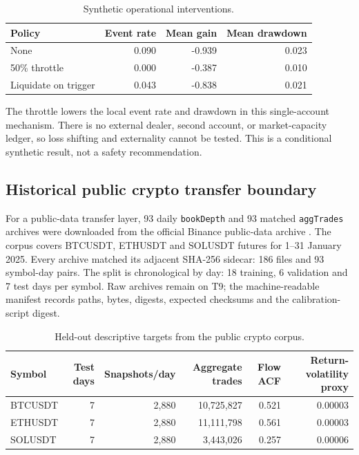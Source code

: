 \documentclass[11pt,a4paper]{article}
\theoremstyle{definition}
\theoremstyle{remark}
\begin{document}
\begin{table}[htbp]
\centering\small
\caption{Synthetic operational interventions.}
\label{tab:next_intervention}
\begin{tabular}{lrrr}
\toprule
Policy & Event rate & Mean gain & Mean drawdown\\
\midrule
None & 0.090 & -0.939 & 0.023\\
50\% throttle & 0.000 & -0.387 & 0.010\\
Liquidate on trigger & 0.043 & -0.838 & 0.021\\
\bottomrule
\end{tabular}
\end{table}

The throttle lowers the local event rate and drawdown in this single-account mechanism. There is no external dealer, second account, or market-capacity ledger, so loss shifting and externality cannot be tested. This is a conditional synthetic result, not a safety recommendation.

\subsection{Historical public crypto transfer boundary}
For a public-data transfer layer, 93 daily \texttt{bookDepth} and 93 matched \texttt{aggTrades} archives were downloaded from the official Binance public-data archive \citep{binancepublic}. The corpus covers BTCUSDT, ETHUSDT and SOLUSDT futures for 1--31 January 2025. Every archive matched its adjacent SHA-256 sidecar: 186 files and 93 symbol-day pairs. The split is chronological by day: 18 training, 6 validation and 7 test days per symbol. Raw archives remain on T9; the machine-readable manifest records paths, bytes, digests, expected checksums and the calibration-script digest.

\begin{table}[htbp]
\centering\small
\caption{Held-out descriptive targets from the public crypto corpus.}
\label{tab:next_l2}
\begin{tabular}{lrrrrr}
\toprule
Symbol & Test days & Snapshots/day & Aggregate trades & Flow ACF & Return-volatility proxy\\
\midrule
BTCUSDT & 7 & 2,880 & 10,725,827 & 0.521 & 0.00003\\
ETHUSDT & 7 & 2,880 & 11,111,798 & 0.561 & 0.00003\\
SOLUSDT & 7 & 2,880 & 3,443,026 & 0.257 & 0.00006\\
\bottomrule
\end{tabular}
\end{table}
\end{document}
